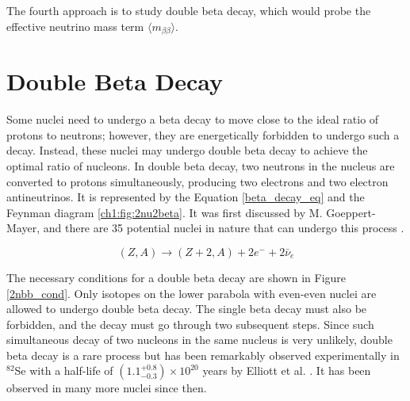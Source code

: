 The fourth approach is to study double beta decay, which would probe the effective neutrino mass term $\langle m_{\beta\beta}\rangle$.

\section{Double Beta Decay}
Some nuclei need to undergo a beta decay to move close to the ideal ratio of protons to neutrons; however, they are energetically forbidden to undergo such a decay. Instead, these nuclei may undergo double beta decay to achieve the optimal ratio of nucleons. In double beta decay, two neutrons in the nucleus are converted to protons simultaneously, producing two electrons and two electron antineutrinos. It is represented by the Equation \ref{beta_decay_eq} and the Feynman diagram \ref{ch1:fig:2nu2beta}. It was first discussed by M. Goeppert-Mayer, and there are 35 potential nuclei in nature that can undergo this process \cite{ZUBER_2012}.

\begin{equation}\label{beta_decay_eq}
(Z,A) \rightarrow (Z+2,A) + 2e^- + 2\bar{\nu}_e
\end{equation}



The necessary conditions for a double beta decay are shown in Figure \ref{2nbb_cond}. Only isotopes on the lower parabola with even-even nuclei are allowed to undergo double beta decay. The single beta decay must also be forbidden, and the decay must go through two subsequent steps. Since such simultaneous decay of two nucleons in the same nucleus is very unlikely, double beta decay is a rare process but has been remarkably observed experimentally in $^{82}$Se with a half-life of $(1.1^{+0.8}_{-0.3})\times 10^{20}$ years by Elliott et al. \cite{PhysRevLett.59.2020}. It has been observed in many more nuclei since then.


